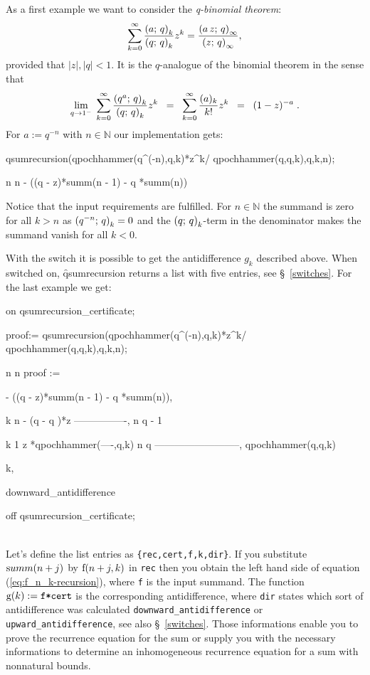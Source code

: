 As a first example we want to consider the {\sl q-binomial theorem}:
\[
	\sum_{k=0}^\infty{\frac{\left(a;\,q\right)_{k}}{\left(q;\,q\right)_{k}}z^k} =
	\frac{\left(a\,z;\,q\right)_{\infty}}{\left(z;\,q\right)_{\infty}},
\]
provided that $|z|,|q|<1$.
It is the $q$-analogue of the binomial theorem in the sense that
\[
	\lim_{q\rightarrow{}1^-}\;{\sum_{k=0}^\infty{
	\frac{\left(q^a;\,q\right)_{k}}{\left(q;\,q\right)_{k}}z^k}} \;\;=\;\;
	\sum_{k=0}^\infty{\frac{(a)_k}{k!}z^k} \;\;=\;\; (1-z)^{-a}\;.
\]
For $a:=q^{-n}$ with $n\in\mathbb{N}$ our implementation gets:
\begin{redoutput}
\redprompt qsumrecursion(qpochhammer(q^(-n),q,k)*z^k/
   qpochhammer(q,q,k),q,k,n);

      n                     n
 - ((q  - z)*summ(n - 1) - q *summ(n))
\end{redoutput}
%
Notice that the input requirements are fulfilled. For $n\in\mathbb{N}$ the
summand is zero for all $k>n$ as $\left(q^{-n};\,q\right)_{k}=0$ and
the $\left(q;\,q\right)_{k}$-term in the denominator makes the summand
vanish for all $k<0$.

With the switch  it is possible
to get the antidifference $g_k$ described above. When switched
on, \f{qsumrecursion} returns a list with five entries,
see \S~\ref{switches}. For the
last example we get:

\begin{redoutput}
\redprompt on qsumrecursion_certificate;

\redprompt proof:= qsumrecursion(qpochhammer(q^(-n),q,k)*z^k/
    qpochhammer(q,q,k),q,k,n);

                n                     n
proof := { - ((q  - z)*summ(n - 1) - q *summ(n)),

                k    n
            - (q  - q )*z
          ----------------,
                n
               q  - 1

            k              1
           z *qpochhammer(----,q,k)
                            n
                           q
          --------------------------,
              qpochhammer(q,q,k)

          k,

          downward_antidifference}

\redprompt off qsumrecursion_certificate;
\end{redoutput}
%
\\[-2.5ex]\noindent{}
Let's define the list entries as \texttt{\{rec,cert,f,k,dir\}}. If you
substitute ${\mathrm summ}(n+j)$ by ${\mathrm f}(n+j,k)$ in \texttt{rec} then
you obtain the left hand side of equation (\ref{eq:f_n_k-recursion}),
where \texttt{f} is the input summand. The function
${\mathrm g}(k):=\texttt{f*cert}$ is the corresponding
antidifference, where \texttt{dir} states which sort of antidifference
was calculated \texttt{downward\_antidifference} or
\texttt{upward\_antidifference}, see also \S~\ref{switches}.
Those informations enable you to prove the recurrence equation for
the sum or supply you with the necessary informations to determine
an inhomogeneous recurrence equation for a sum with nonnatural bounds.

